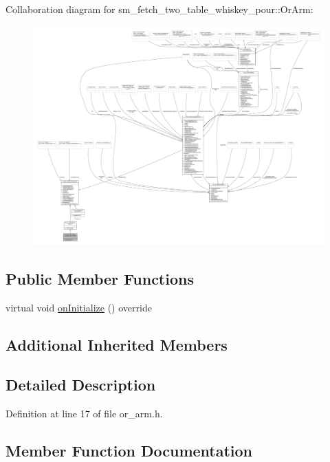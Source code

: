 Collaboration diagram for sm\+\_\+fetch\+\_\+two\+\_\+table\+\_\+whiskey\+\_\+pour\+:\+:Or\+Arm\+:
\nopagebreak
\begin{figure}[H]
\begin{center}
\leavevmode
\includegraphics[width=350pt]{classsm__fetch__two__table__whiskey__pour_1_1OrArm__coll__graph}
\end{center}
\end{figure}
\subsection*{Public Member Functions}
\begin{DoxyCompactItemize}
\item 
virtual void \hyperlink{classsm__fetch__two__table__whiskey__pour_1_1OrArm_a8f222ade9f086bdba5732960ce889eeb}{on\+Initialize} () override
\end{DoxyCompactItemize}
\subsection*{Additional Inherited Members}


\subsection{Detailed Description}


Definition at line 17 of file or\+\_\+arm.\+h.



\subsection{Member Function Documentation}
\mbox{\label{classsm__fetch__two__table__whiskey__pour_1_1OrArm_a8f222ade9f086bdba5732960ce889eeb}} 
